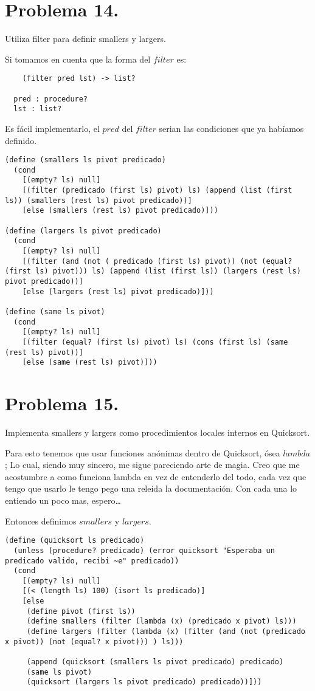 \documentclass{article}
\begin{document}
\section*{Problema 14.}
Utiliza filter para definir smallers y largers.

Si tomamos en cuenta que la forma del $filter$ es:

\begin{lstlisting}
    (filter pred lst) -> list?

  pred : procedure?
  lst : list?
\end{lstlisting}

Es fácil implementarlo, el $pred$ del $filter$ serian las condiciones que ya habíamos definido.

\begin{lstlisting}
(define (smallers ls pivot predicado)
  (cond
    [(empty? ls) null]
    [(filter (predicado (first ls) pivot) ls) (append (list (first ls)) (smallers (rest ls) pivot predicado))]
    [else (smallers (rest ls) pivot predicado)]))

(define (largers ls pivot predicado)
  (cond
    [(empty? ls) null]
    [(filter (and (not ( predicado (first ls) pivot)) (not (equal? (first ls) pivot))) ls) (append (list (first ls)) (largers (rest ls) pivot predicado))]
    [else (largers (rest ls) pivot predicado)]))

(define (same ls pivot)
  (cond
    [(empty? ls) null]
    [(filter (equal? (first ls) pivot) ls) (cons (first ls) (same (rest ls) pivot))]
    [else (same (rest ls) pivot)]))
\end{lstlisting}

\section*{Problema 15.}
Implementa smallers y largers como procedimientos locales internos en Quicksort.

Para esto tenemos que usar funciones anónimas dentro de Quicksort, ósea $lambda$; Lo cual, siendo muy sincero, me sigue pareciendo arte de magia. Creo que me acostumbre a como funciona lambda en vez de entenderlo del todo, cada vez que tengo que usarlo le tengo pego una releída la documentación. Con cada una lo entiendo un poco mas, espero…

Entonces definimos $smallers$ y $largers$.

\begin{lstlisting}
(define (quicksort ls predicado)
  (unless (procedure? predicado) (error quicksort "Esperaba un predicado valido, recibi ~e" predicado))
  (cond
    [(empty? ls) null]
    [(< (length ls) 100) (isort ls predicado)]
    [else
     (define pivot (first ls))
     (define smallers (filter (lambda (x) (predicado x pivot) ls)))
     (define largers (filter (lambda (x) (filter (and (not (predicado x pivot)) (not (equal? x pivot))) ) ls)))
     
     (append (quicksort (smallers ls pivot predicado) predicado) 
     (same ls pivot) 
     (quicksort (largers ls pivot predicado) predicado))]))
\end{lstlisting}
\end{document}
